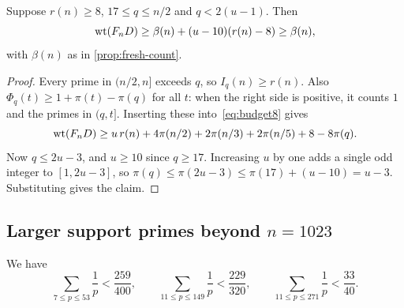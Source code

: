 \begin{lemma}\label{lem:prime-budget}
Suppose $r(n)\ge8$, $17\le q\le n/2$ and $q<2(u-1)$. Then
\[
 \operatorname{wt}(F_nD)\ge\beta(n)+(u-10)(r(n)-8)\ge\beta(n),
\]
with $\beta(n)$ as in \cref{prop:fresh-count}.
\end{lemma}

\begin{proof}
Every prime in $(n/2,n]$ exceeds $q$, so $I_q(n)\ge r(n)$. Also $\Phi_q(t)\ge1+\pi(t)-\pi(q)$ for all $t$: when the right side is positive, it counts $1$ and the primes in $(q,t]$. Inserting these into~\eqref{eq:budget8} gives
\[
 \operatorname{wt}(F_nD)\ge u\,r(n)+4\pi(n/2)+2\pi(n/3)+2\pi(n/5)+8-8\pi(q).
\]
Now $q\le2u-3$, and $u\ge10$ since $q\ge17$. Increasing $u$ by one adds a single odd integer to $[1,2u-3]$, so $\pi(q)\le\pi(2u-3)\le\pi(17)+(u-10)=u-3$. Substituting gives the claim.
\end{proof}

\subsection{Larger support primes beyond \texorpdfstring{$n=1023$}{n = 1023}}

\begin{lemma}\label{lem:reciprocals}
We have
\[
 \sum_{7\le p\le53}\frac1p<\frac{259}{400},\qquad
 \sum_{11\le p\le149}\frac1p<\frac{229}{320},\qquad
 \sum_{11\le p\le271}\frac1p<\frac{33}{40}.
\]
\end{lemma}

